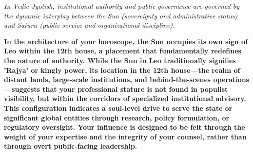 


{\fontsize{9.5}{14}\selectfont\color{DeepSlate}\itshape In Vedic Jyotish, institutional authority and public governance are governed by the dynamic interplay between the Sun (sovereignty and administrative status) and Saturn (public service and organizational discipline).}\par\vspace{3.5mm}

\label{topic42}

{\fontsize{9.5}{13.8}\selectfont\bfseries\color{DeepSlate} In the architecture of your horoscope, the Sun occupies its own sign of Leo within the 12th house, a placement that fundamentally redefines the nature of authority. While the Sun in Leo traditionally signifies 'Rajya' or kingly power, its location in the 12th house---the realm of distant lands, large-scale institutions, and behind-the-scenes operations---suggests that your professional stature is not found in populist visibility, but within the corridors of specialized institutional advisory. This configuration indicates a soul-level drive to serve the state or significant global entities through research, policy formulation, or regulatory oversight. Your influence is designed to be felt through the weight of your expertise and the integrity of your counsel, rather than through overt public-facing leadership.}\par\vspace{2mm}

